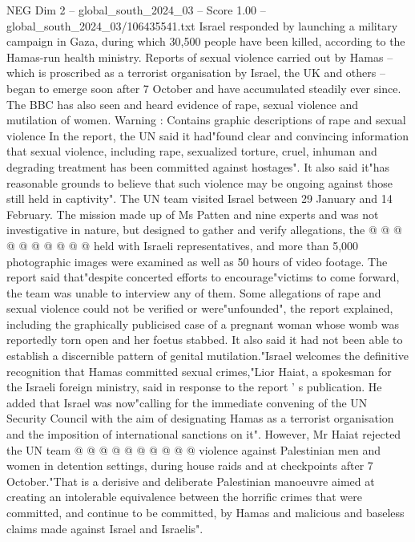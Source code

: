 \begin{textsample}{NEG Dim 2 – global\_south\_2024\_03 – Score 1.00 – global\_south\_2024\_03/106435541.txt}  \label{ex:f2_neg_110}
Israel responded by launching a military campaign in Gaza, during which 30,500 people have been killed, according to the Hamas-run health ministry.
Reports of sexual violence carried out by Hamas -- which is proscribed as a terrorist organisation by Israel, the UK and others -- began to emerge soon after 7 October and have accumulated steadily ever since.
The BBC has also seen and heard evidence of rape, sexual violence and mutilation of women.
Warning : Contains graphic descriptions of rape and sexual violence In the report, the UN said it had"found clear and convincing information that sexual violence, including rape, sexualized torture, cruel, inhuman and degrading treatment has been committed against hostages".
It also said it"has reasonable grounds to believe that such violence may be ongoing against those still held in captivity".
The UN team visited Israel between 29 January and 14 February.
The mission made up of Ms Patten and nine experts and was not investigative in nature, but designed to gather and verify allegations, the @ @ @ @ @ @ @ @ @ @ held with Israeli representatives, and more than 5,000 photographic images were examined as well as 50 hours of video footage.
The report said that"despite concerted efforts to encourage"victims to come forward, the team was unable to interview any of them.
Some allegations of rape and sexual violence could not be verified or were"unfounded", the report explained, including the graphically publicised case of a pregnant woman whose womb was reportedly torn open and her foetus stabbed.
It also said it had not been able to establish a discernible pattern of genital mutilation."Israel welcomes the definitive recognition that Hamas committed sexual crimes,"Lior Haiat, a spokesman for the Israeli foreign ministry, said in response to the report ' s publication.
He added that Israel was now"calling for the immediate convening of the UN Security Council with the aim of designating Hamas as a terrorist organisation and the imposition of international sanctions on it".
However, Mr Haiat rejected the UN team @ @ @ @ @ @ @ @ @ @ violence against Palestinian men and women in detention settings, during house raids and at checkpoints after 7 October."That is a derisive and deliberate Palestinian manoeuvre aimed at creating an intolerable equivalence between the horrific crimes that were committed, and continue to be committed, by Hamas and malicious and baseless claims made against Israel and Israelis".

\end{textsample}
